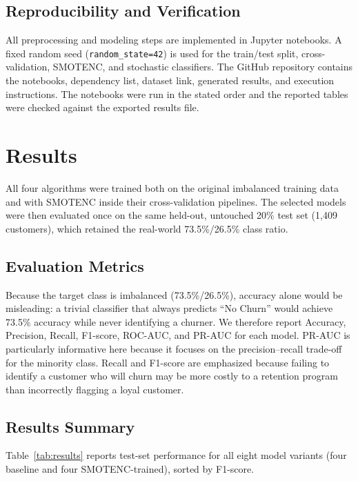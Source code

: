 \documentclass[conference]{IEEEtran}
\begin{document}
	\subsection{Reproducibility and Verification}
	All preprocessing and modeling steps are implemented in Jupyter notebooks. A fixed random seed (\texttt{random\_state=42}) is used for the train/test split, cross-validation, SMOTENC, and stochastic classifiers. The GitHub repository contains the notebooks, dependency list, dataset link, generated results, and execution instructions. The notebooks were run in the stated order and the reported tables were checked against the exported results file.
	
	\section{Results}
	\label{sec:results}
	
	All four algorithms were trained both on the original imbalanced training data and with SMOTENC inside their cross-validation pipelines. The selected models were then evaluated once on the same held-out, untouched 20\% test set (1{,}409 customers), which retained the real-world 73.5\%/26.5\% class ratio.
	
	\subsection{Evaluation Metrics}
	Because the target class is imbalanced (73.5\%/26.5\%), accuracy alone would be misleading: a trivial classifier that always predicts ``No Churn'' would achieve 73.5\% accuracy while never identifying a churner. We therefore report Accuracy, Precision, Recall, F1-score, ROC-AUC, and PR-AUC for each model. PR-AUC is particularly informative here because it focuses on the precision--recall trade-off for the minority class. Recall and F1-score are emphasized because failing to identify a customer who will churn may be more costly to a retention program than incorrectly flagging a loyal customer.
	
	\subsection{Results Summary}
	Table~\ref{tab:results} reports test-set performance for all eight model variants (four baseline and four SMOTENC-trained), sorted by F1-score.
	
\end{document}
